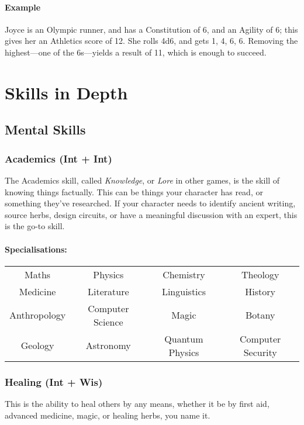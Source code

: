 \paragraph{Example} Joyce is an Olympic runner, and has a Constitution of 6, and an Agility of 6; this gives her an Athletics score of 12. 
She rolls 4d6, and gets 1, 4, 6, 6. Removing the highest---one of the 6s---yields a result of 11, which is enough to succeed.

\newpage
\section{Skills in Depth}
\subsection{Mental Skills}
\subsubsection{Academics (Int + Int)}
The Academics skill, called \textit{Knowledge}, or \textit{Lore} in other games, is the skill of knowing things factually. 
This can be things your character has read, or something they've researched.
If your character needs to identify ancient writing, source herbs, design circuits, or have a meaningful discussion with an expert, this is the go-to skill.

\paragraph{Specialisations:}
\begin{center}
    \begin{tabular}{c|c|c|c}
        Maths & Physics & Chemistry & Theology \\
        Medicine & Literature & Linguistics & History \\
        Anthropology & Computer Science & Magic & Botany \\
        Geology & Astronomy & Quantum Physics & Computer Security \\
    \end{tabular}
\end{center}

\subsubsection{Healing (Int + Wis)}
This is the ability to heal others by any means, whether it be by first aid, advanced medicine, magic, or healing herbs, you name it. 

